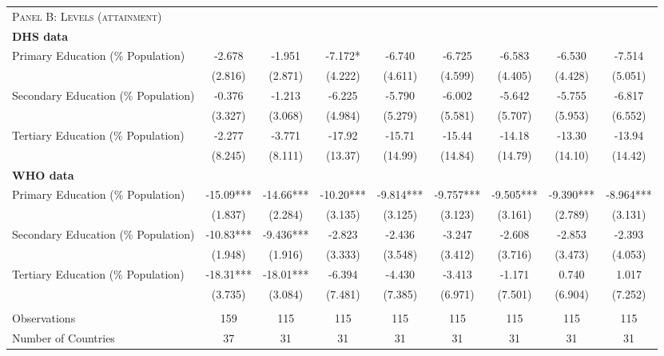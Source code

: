 \begin{landscape}
\begin{table}[htpb!]
\begin{center}
\begin{tabular}{lcccccccc}
\midrule\multicolumn{9}{l}{\textsc{Panel B: Levels (attainment)}}\\\textbf{DHS data} &&&&&&&&\\ 
Primary Education (\% Population) &-2.678&-1.951&-7.172*&-6.740&-6.725&-6.583&-6.530&-7.514\\
&(2.816)&(2.871)&(4.222)&(4.611)&(4.599)&(4.405)&(4.428)&(5.051)\\
Secondary Education (\% Population) &-0.376&-1.213&-6.225&-5.790&-6.002&-5.642&-5.755&-6.817\\
&(3.327)&(3.068)&(4.984)&(5.279)&(5.581)&(5.707)&(5.953)&(6.552)\\
Tertiary Education (\% Population) &-2.277&-3.771&-17.92&-15.71&-15.44&-14.18&-13.30&-13.94\\
&(8.245)&(8.111)&(13.37)&(14.99)&(14.84)&(14.79)&(14.10)&(14.42)\\
\textbf{WHO data} &&&&&&&&\\ 
Primary Education (\% Population) &-15.09***&-14.66***&-10.20***&-9.814***&-9.757***&-9.505***&-9.390***&-8.964***
\\
&(1.837)&(2.284)&(3.135)&(3.125)&(3.123)&(3.161)&(2.789)&(3.131)
\\
Secondary Education (\% Population) &-10.83***&-9.436***&-2.823&-2.436&-3.247&-2.608&-2.853&-2.393
\\
&(1.948)&(1.916)&(3.333)&(3.548)&(3.412)&(3.716)&(3.473)&(4.053)
\\
Tertiary Education (\% Population) &-18.31***&-18.01***&-6.394&-4.430&-3.413&-1.171&0.740&1.017
\\
&(3.735)&(3.084)&(7.481)&(7.385)&(6.971)&(7.501)&(6.904)&(7.252)
\\
\begin{footnotesize}\end{footnotesize}&\begin{footnotesize}\end{footnotesize}&\begin{footnotesize}\end{footnotesize}&\begin{footnotesize}\end{footnotesize}&\begin{footnotesize}\end{footnotesize}&\begin{footnotesize}\end{footnotesize}&\begin{footnotesize}\end{footnotesize}&\begin{footnotesize}\end{footnotesize}\\Observations&159&115&115&115&115&115&115&115\\Number of Countries&37&31&31&31&31&31&31&31\\\midrule

\end{tabular}
\end{center}
\end{table}
\end{landscape}
